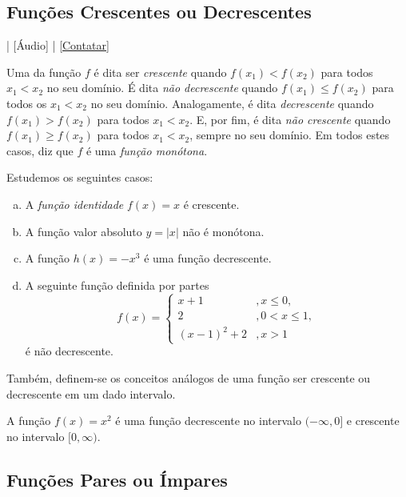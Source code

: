 \subsection{Funções Crescentes ou Decrescentes}

\begin{flushright}
  [Vídeo] | [Áudio] | \href{https://phkonzen.github.io/notas/contato.html}{[Contatar]}
\end{flushright}

Uma da função $f$ é dita ser \emph{crescente} quando $f(x_1)<f(x_2)$ para todos $x_1<x_2$ no seu domínio. É dita \emph{não decrescente} quando $f(x_1)\leq f(x_2)$ para todos os $x_1<x_2$ no seu domínio. Analogamente, é dita \emph{decrescente} quando $f(x_1)>f(x_2)$ para todos $x_1<x_2$. E, por fim, é dita \emph{não crescente} quando $f(x_1)\geq f(x_2)$ para todos $x_1<x_2$, sempre no seu domínio. Em todos estes casos, diz que $f$ é uma \emph{função monótona}.

\begin{ex}
  Estudemos os seguintes casos:
  \begin{enumerate}[a)]
  \item A \emph{função identidade} $f(x)=x$ é crescente.
  \item A função valor absoluto $y=|x|$ não é monótona.
  \item A função $h(x)=-x^3$ é uma função decrescente. 
  \item A seguinte função definida por partes
    \begin{equation}
      f(x) = \left\{
        \begin{array}{ll}
          x+1 &,x\leq 0,\\
          2 &,0<x\leq 1,\\
          (x-1)^2+2 &, x>1
        \end{array}
      \right.
    \end{equation}
    é não decrescente.
  \end{enumerate}
\end{ex}

Também, definem-se os conceitos análogos de uma função ser crescente ou decrescente em um dado intervalo.

\begin{ex}
  A função $f(x) = x^2$ é uma função decrescente no intervalo $(-\infty, 0]$ e crescente no intervalo $[0, \infty)$.
\end{ex}

\subsection{Funções Pares ou Ímpares}

